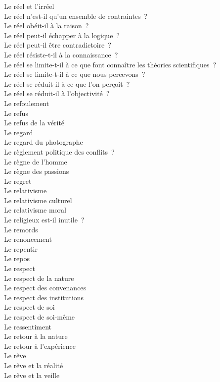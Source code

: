 \documentclass[a4paper,12pt]{article}
\begin{document}
Le réel et l'irréel \\
Le réel n'est-il qu'un ensemble de contraintes ? \\
Le réel obéit-il à la raison ? \\
Le réel peut-il échapper à la logique ? \\
Le réel peut-il être contradictoire ? \\
Le réel résiste-t-il à la connaissance ? \\
Le réel se limite-t-il à ce que font connaître les théories scientifiques ? \\
Le réel se limite-t-il à ce que nous percevons ? \\
Le réel se réduit-il à ce que l'on perçoit ? \\
Le réel se réduit-il à l'objectivité ? \\
Le refoulement \\
Le refus \\
Le refus de la vérité \\
Le regard \\
Le regard du photographe \\
Le règlement politique des conflits ? \\
Le règne de l'homme \\
Le règne des passions \\
Le regret \\
Le relativisme \\
Le relativisme culturel \\
Le relativisme moral \\
Le religieux est-il inutile ? \\
Le remords \\
Le renoncement \\
Le repentir \\
Le repos \\
Le respect \\
Le respect de la nature \\
Le respect des convenances \\
Le respect des institutions \\
Le respect de soi \\
Le respect de soi-même \\
Le ressentiment \\
Le retour à la nature \\
Le retour à l'expérience \\
Le rêve \\
Le rêve et la réalité \\
Le rêve et la veille \\
\end{document}
